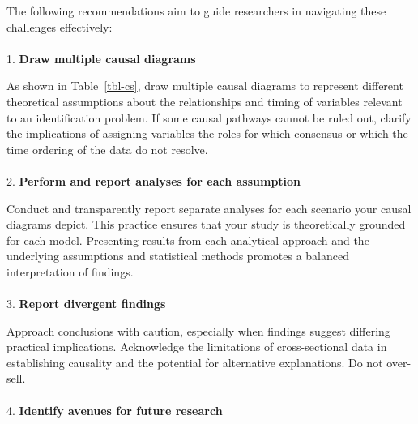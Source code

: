 \documentclass[
  singlecolumn]{article}
\makeatletter
\let\oldparagraph\paragraph
\renewcommand{\paragraph}{
    \@ifstar
      \xxxParagraphStar
      \xxxParagraphNoStar
  }
\newcommand{\xxxParagraphStar}[1]{\oldparagraph*{#1}\mbox{}}
\newcommand{\xxxParagraphNoStar}[1]{\oldparagraph{#1}\mbox{}}
\makeatother
\begin{document}
The following recommendations aim to guide researchers in navigating
these challenges effectively:

\paragraph{\texorpdfstring{1. \textbf{Draw multiple causal
diagrams}}{1. Draw multiple causal diagrams}}\label{draw-multiple-causal-diagrams}

As shown in Table~\ref{tbl-cs}, draw multiple causal diagrams to
represent different theoretical assumptions about the relationships and
timing of variables relevant to an identification problem. If some
causal pathways cannot be ruled out, clarify the implications of
assigning variables the roles for which consensus or which the time
ordering of the data do not resolve.

\paragraph{\texorpdfstring{2. \textbf{Perform and report analyses for
each
assumption}}{2. Perform and report analyses for each assumption}}\label{perform-and-report-analyses-for-each-assumption}

Conduct and transparently report separate analyses for each scenario
your causal diagrams depict. This practice ensures that your study is
theoretically grounded for each model. Presenting results from each
analytical approach and the underlying assumptions and statistical
methods promotes a balanced interpretation of findings.

\paragraph{\texorpdfstring{3. \textbf{Report divergent
findings}}{3. Report divergent findings}}\label{report-divergent-findings}

Approach conclusions with caution, especially when findings suggest
differing practical implications. Acknowledge the limitations of
cross-sectional data in establishing causality and the potential for
alternative explanations. Do not over-sell.

\paragraph{\texorpdfstring{4. \textbf{Identify avenues for future
research}}{4. Identify avenues for future research}}\label{identify-avenues-for-future-research}
\end{document}

